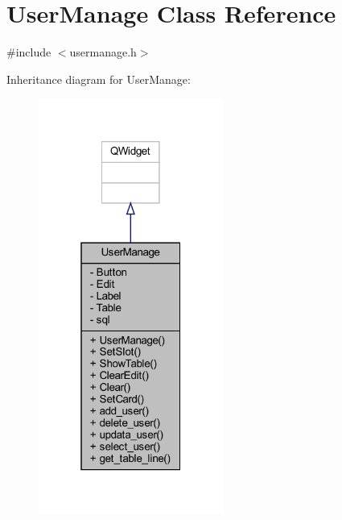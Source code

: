 \hypertarget{class_user_manage}{}\section{User\+Manage Class Reference}
\label{class_user_manage}


{\ttfamily \#include $<$usermanage.\+h$>$}



Inheritance diagram for User\+Manage\+:
\nopagebreak
\begin{figure}[H]
\begin{center}
\leavevmode
\includegraphics[width=172pt]{class_user_manage__inherit__graph}
\end{center}
\end{figure}


